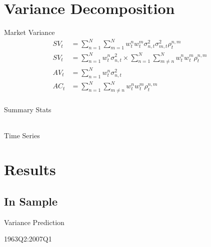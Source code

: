 \documentclass{beamer}
\begin{document}
\section{Variance Decomposition}

\begin{frame}{Market Variance}
	\begin{align}
	SV_{t} &= \sum_{n=1}^{N} \sum_{m=1}^{N}w^{n}_{t}w^{m}_{t}\sigma^{2}_{n,t}\sigma^{2}_{m,t}\rho^{n,m}_{t}\\
	SV_{t} &= \sum_{n=1}^{N} w^{n}_{t}\sigma^{2}_{n,t} \times \sum_{n=1}^{N}\sum_{m \neq n}^{N}w^{n}_{t}w^{m}_{t}\rho^{n,m}_{t}\\
	AV_{t} &= \sum_{n=1}^{N} w^{n}_{t}\sigma^{2}_{n,t}\\
	AC_{t} &= \sum_{n=1}^{N}\sum_{m \neq n}^{N}w^{n}_{t}w^{m}_{t}\rho^{n,m}_{t}\\
	\end{align}
\end{frame}

\begin{frame}{Summary Stats}
	\begin{table}[!htbp] \centering 
		\begin{adjustbox}{width=\textwidth}
			\begin{tabular}{lcccccc} 
				
				
			\end{tabular}
		\end{adjustbox}
	\end{table}
\end{frame}

\begin{frame}{Time Series}
	\begin{adjustbox}{width=\textwidth}
			
	\end{adjustbox}
\end{frame}

\section{Results}
\subsection{In Sample}

\begin{frame}{Variance Prediction}
	\vspace{-12pt}
	\begin{table}
		\caption{1963Q2:2007Q1}
		\vspace{-18pt}
		\begin{adjustbox}{width=\textwidth,height=3cm}
		
	\end{adjustbox}
	\end{table}
\end{frame}
\end{document}
